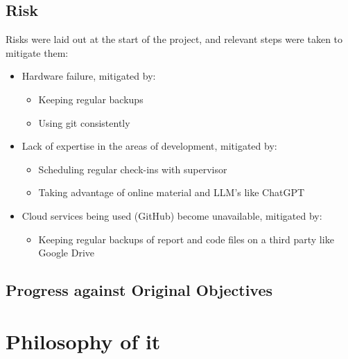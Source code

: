 \documentclass[12pt,a4paper]{article}
\begin{document}
\subsection{Risk}
Risks were laid out at the start of the project, and relevant steps were taken to mitigate them:
\begin{itemize}
    \item Hardware failure, mitigated by:
    \begin{itemize}
        \item Keeping regular backups
        \item Using git consistently
    \end{itemize}
    \item Lack of expertise in the areas of development, mitigated by:
    \begin{itemize}
        \item Scheduling regular check-ins with supervisor
        \item Taking advantage of online material and LLM's like ChatGPT
    \end{itemize}
    \item Cloud services being used (GitHub) become unavailable, mitigated by:
    \begin{itemize}
        \item Keeping regular backups of report and code files on a third party like Google Drive
    \end{itemize}
\end{itemize}
\subsection{Progress against Original Objectives}

\section{Philosophy of it}
\newpage

\end{document}
